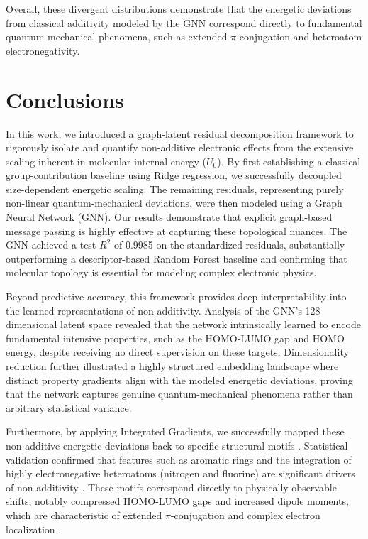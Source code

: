 \documentclass[]{article}
\begin{document}
Overall, these divergent distributions demonstrate that the energetic deviations from classical additivity modeled by the GNN correspond directly to fundamental quantum-mechanical phenomena, such as extended $\pi$-conjugation and heteroatom electronegativity.

\section{Conclusions}
\label{sec:conclusions}
In this work, we introduced a graph-latent residual decomposition framework to rigorously isolate and quantify non-additive electronic effects from the extensive scaling inherent in molecular internal energy ($U_0$). By first establishing a classical group-contribution baseline using Ridge regression, we successfully decoupled size-dependent energetic scaling. The remaining residuals, representing purely non-linear quantum-mechanical deviations, were then modeled using a Graph Neural Network (GNN). Our results demonstrate that explicit graph-based message passing is highly effective at capturing these topological nuances. The GNN achieved a test $R^2$ of 0.9985 on the standardized residuals, substantially outperforming a descriptor-based Random Forest baseline and confirming that molecular topology is essential for modeling complex electronic physics.

Beyond predictive accuracy, this framework provides deep interpretability into the learned representations of non-additivity. Analysis of the GNN's 128-dimensional latent space revealed that the network intrinsically learned to encode fundamental intensive properties, such as the HOMO-LUMO gap and HOMO energy, despite receiving no direct supervision on these targets. Dimensionality reduction further illustrated a highly structured embedding landscape where distinct property gradients align with the modeled energetic deviations, proving that the network captures genuine quantum-mechanical phenomena rather than arbitrary statistical variance.

Furthermore, by applying Integrated Gradients, we successfully mapped these non-additive energetic deviations back to specific structural motifs \citep{sundararajan2017axiomaticattributiondeepnetworks,polat2025xchemagentsagenticaiexplainable,ji2026molledgeradditivegraphneural}. Statistical validation confirmed that features such as aromatic rings and the integration of highly electronegative heteroatoms (nitrogen and fluorine) are significant drivers of non-additivity \citep{lundstrom2022rigorousstudyintegratedgradients,wang2026explainablemolecularpropertyprediction}. These motifs correspond directly to physically observable shifts, notably compressed HOMO-LUMO gaps and increased dipole moments, which are characteristic of extended $\pi$-conjugation and complex electron localization \citep{chen2026interpretablemachinelearningquantuminformed,mick2026datafusioncontrastivealignment,bigting2026martinimapperautomatedfragmentbased}.
\end{document}
